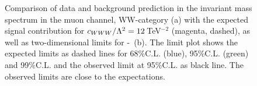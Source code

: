 \begin{figure}
    \centering
    \resizebox{\columnwidth}{!}
    {%
    \caption[Comparison of data and background prediction as well as two-dimensional limits for \Tccw -\Tcb]{Comparison of data and background prediction in the invariant mass spectrum in the muon channel, WW-category (a) with the expected signal contribution for $c_{WWW}/\Lambda^2=12$\,TeV$^{-2}$ (magenta, dashed), as well as two-dimensional limits for \Tccw -\Tcb \ (b). The limit plot shows the expected limits as dashed lines for 68\%C.L. (blue), 95\%C.L. (green) and 99\%C.L. and the observed limit at 95\%C.L. as black line. The observed limits are close to the expectations.}
    \label{fig:conclusion}
    }
\end{figure}